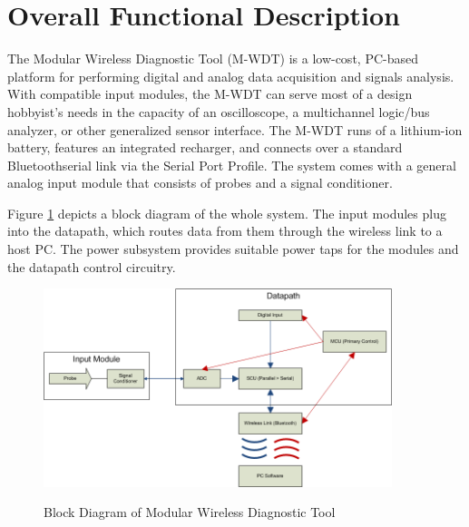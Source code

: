 \section{Overall Functional Description}
The Modular Wireless Diagnostic Tool (M-WDT) is a low-cost, PC-based platform
 for performing digital and analog data acquisition and signals analysis. 
With compatible input modules, the M-WDT can serve most of a design hobbyist's 
needs in the capacity of an oscilloscope, a multichannel logic/bus analyzer, or
 other generalized sensor interface. The M-WDT runs of a lithium-ion battery, features an integrated recharger, and connects over a standard 
Bluetooth\textregistered serial link via the Serial Port Profile. The system comes with a general analog input module that consists of probes and a signal conditioner. 

Figure \ref{fig:overall_block} depicts a block diagram of the whole system. The input modules plug into the datapath, which routes data from them through the 
wireless link to a host PC. The power subsystem provides suitable power taps for the modules and the datapath control circuitry. 

\begin{figure}[bhp]
\caption[Block Diagram Overview]{Block Diagram of Modular Wireless Diagnostic Tool}
\includegraphics[width=4in]{../drawings/overview_block.png}
\label{fig:overall_block}
\end{figure} 
